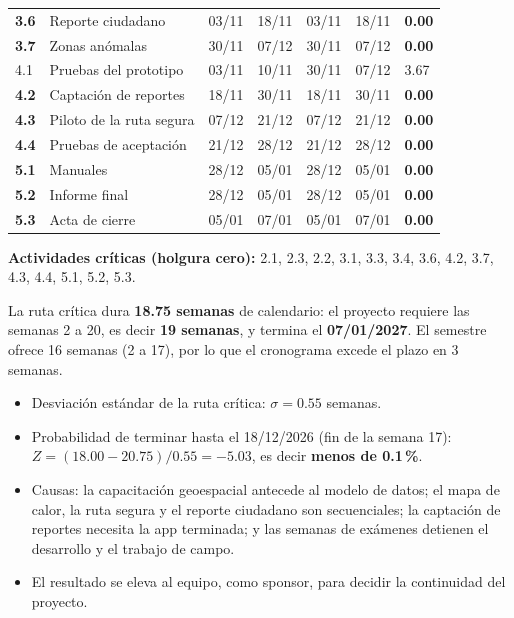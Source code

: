 \documentclass[11pt,a4paper]{article}
\begin{document}
{\begin{longtable}{@{}P{0.75cm} >{\raggedright\arraybackslash}p{5.2cm} C{1.6cm} C{1.6cm} C{1.6cm} C{1.6cm} Q{1.3cm}@{}}
\textbf{3.6} & Reporte ciudadano & 03/11 & 18/11 & 03/11 & 18/11 & \textcolor{RaciR}{\textbf{0.00}} \\
\textbf{3.7} & Zonas anómalas & 30/11 & 07/12 & 30/11 & 07/12 & \textcolor{RaciR}{\textbf{0.00}} \\
4.1 & Pruebas del prototipo & 03/11 & 10/11 & 30/11 & 07/12 & 3.67 \\
\textbf{4.2} & Captación de reportes & 18/11 & 30/11 & 18/11 & 30/11 & \textcolor{RaciR}{\textbf{0.00}} \\
\textbf{4.3} & Piloto de la ruta segura & 07/12 & 21/12 & 07/12 & 21/12 & \textcolor{RaciR}{\textbf{0.00}} \\
\textbf{4.4} & Pruebas de aceptación & 21/12 & 28/12 & 21/12 & 28/12 & \textcolor{RaciR}{\textbf{0.00}} \\
\textbf{5.1} & Manuales & 28/12 & 05/01 & 28/12 & 05/01 & \textcolor{RaciR}{\textbf{0.00}} \\
\textbf{5.2} & Informe final & 28/12 & 05/01 & 28/12 & 05/01 & \textcolor{RaciR}{\textbf{0.00}} \\
\textbf{5.3} & Acta de cierre & 05/01 & 07/01 & 05/01 & 07/01 & \textcolor{RaciR}{\textbf{0.00}} \\
\end{longtable}
}

\vspace{0.1cm}
\noindent\textbf{Actividades críticas (holgura cero):} 2.1, 2.3, 2.2, 3.1, 3.3, 3.4, 3.6, 4.2, 3.7, 4.3, 4.4, 5.1, 5.2, 5.3.

\vspace{0.1cm}
\noindent La ruta crítica dura \textbf{18.75 semanas} de calendario: el proyecto requiere las semanas 2 a 20, es decir \textbf{19 semanas}, y termina el \textbf{07/01/2027}. El semestre ofrece 16 semanas (2 a 17), por lo que el cronograma excede el plazo en 3 semanas.

\begin{itemize}[leftmargin=*]
    \item Desviación estándar de la ruta crítica: $\sigma = 0.55$ semanas.
    \item Probabilidad de terminar hasta el 18/12/2026 (fin de la semana 17): $Z = (18.00 - 20.75)/0.55 = -5.03$, es decir \textbf{menos de 0.1\,\%}.
    \item Causas: la capacitación geoespacial antecede al modelo de datos; el mapa de calor, la ruta segura y el reporte ciudadano son secuenciales; la captación de reportes necesita la app terminada; y las semanas de exámenes detienen el desarrollo y el trabajo de campo.
    \item El resultado se eleva al equipo, como sponsor, para decidir la continuidad del proyecto.
\end{itemize}
\end{document}
